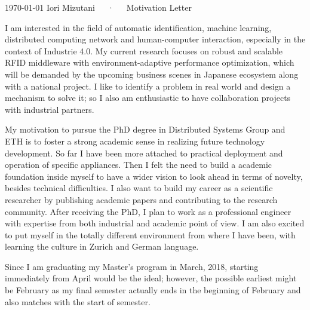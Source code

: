 \documentclass[11pt, a4paper]{awesome-cv}
\begin{document}
\makecvheader[R]

\makecvfooter
  {\today}
  {Iori Mizutani~~~·~~~Motivation Letter}
  {}

\makelettertitle

\begin{cvletter}

I am interested in the field of automatic identification, machine learning, distributed computing network and human-computer interaction, especially in the context of Industrie 4.0.
My current research focuses on robust and scalable RFID middleware with environment-adaptive performance optimization, which will be demanded by the upcoming business scenes in Japanese ecosystem along with a national project.
I like to identify a problem in real world and design a mechanism to solve it; so I also am enthusiastic to have collaboration projects with industrial partners.

My motivation to pursue the PhD degree in Distributed Systems Group and ETH is to foster a strong academic sense in realizing future technology development.
So far I have been more attached to practical deployment and operation of specific appliances.
Then I felt the need to build a academic foundation inside myself to have a wider vision to look ahead in terms of novelty, besides technical difficulties.
I also want to build my career as a scientific researcher by publishing academic papers and contributing to the research community.
After receiving the PhD, I plan to work as a professional engineer with expertise from both industrial and academic point of view.
I am also excited to put myself in the totally different environment from where I have been, with learning the culture in Zurich and German language.

Since I am graduating my Master’s program in March, 2018, starting immediately from April would be the ideal;
however, the possible earliest might be February as my final semester actually ends in the beginning of February and also matches with the start of semester.

\end{cvletter}


\makeletterclosing
\end{document}
